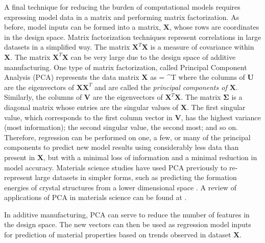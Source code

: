 A final technique for reducing the burden of computational models requires expressing model data in a matrix and performing matrix factorization. As before, model inputs can be formed into a matrix, $\mathbf{X}$, whose rows are coordinates in the design space. Matrix factorization techniques represent correlations in large datasets in a simplified way. The matrix $\mathbf{X}^T\mathbf{X}$ is a measure of covariance within $\mathbf{X}$. The matrix $\mathbf{X}^T\mathbf{X}$ can be very large due to the design space of additive manufacturing. One type of matrix factorization, called Principal Component Analysis (PCA) represents the data matrix $\mathbf{X}$ as
\eqn
	 =  \mathbf{\Sigma}^T
	\label{PCA}
\equ
where the columns of $\mathbf{U}$ are the eigenvectors of $\mathbf{X}\mathbf{X}^T$ and are called the \textit{principal components of $\mathbf{X}$}. Similarly, the columns of $\mathbf{V}$ are the eigenvectors of $\mathbf{X}^T\mathbf{X}$. The matrix $\mathbf{\Sigma}$ is a diagonal matrix whose entries are the singular values of $\mathbf{X}$. The first singular value, which corresponds to the first column vector in $\mathbf{V}$, has the highest variance (most information); the second singular value, the second most; and so on. Therefore, regression can be performed on one, a few, or many of the principal components to predict new model results using considerably less data than present in $\mathbf{X}$, but with a minimal loss of information and a minimal reduction in model accuracy.  Materials science studies have used PCA previously to re-represent large datasets in simpler forms, such as predicting the formation energies of crystal structures from a lower dimensional space \cite{Curtarolo2003}. A review of applications of PCA in materials science can be found at \cite{Rajan2009}.

In additive manufacturing, PCA can serve to reduce the number of features in the design space. The new vectors can then be used as regression model inputs for prediction of material properties based on trends observed in dataset $\mathbf{X}$.


